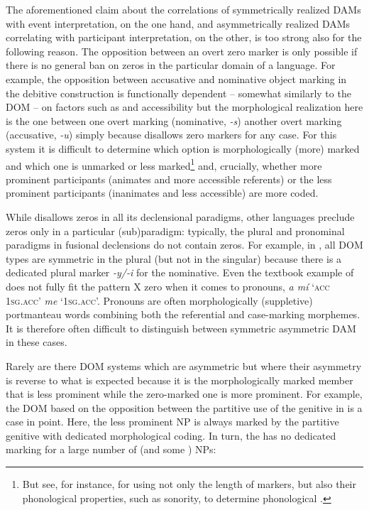 \documentclass[output=paper]{LSP/langsci}
\begin{document}
The aforementioned claim about the correlations of symmetrically realized DAMs with event interpretation, on the one hand, and asymmetrically realized DAMs correlating with participant interpretation, on the other, is too strong also for the following reason. 
The opposition between an overt \vs zero marker is only possible if there is no general ban on zeros in the particular domain of a language. 
For example, the opposition between accusative and nominative object marking in the  debitive construction is functionally dependent – somewhat similarly to the  DOM – on factors such as  and accessibility but the morphological realization here is the one between one overt marking (nominative, \eg \textit{-s}) \vs another overt marking (accusative, \eg \textit{-u}) simply because  disallows zero markers for any case. 
For this  system it is difficult to determine which option is morphologically (more) marked and which one is unmarked or less marked\footnote{But see, for instance, \citet{Keineetal2008Differential} for using not only the length of markers, but also their phonological properties, such as sonority, to determine phonological .} and, crucially, whether more prominent participants (animates and more accessible referents) or the less prominent participants (inanimates and less accessible) are more coded.

While  disallows zeros in all its declensional paradigms, other languages preclude zeros only in a particular (sub)paradigm: typically, the plural and pronominal paradigms in fusional declensions do not contain zeros. 
For example, in , all DOM types are symmetric in the plural (but not in the singular) because there is a dedicated plural marker \textit{-y/-i} for the nominative. 
Even the textbook example of  does not fully fit the pattern X \vs zero when it comes to pronouns, \cf \textit{a mí} `\textsc{acc 1sg.acc}' \vs \textit{me} `\textsc{1sg.acc}'. 
Pronouns are often morphologically (suppletive) portmanteau words combining both the referential and case-marking morphemes. 
It is therefore often difficult to distinguish between symmetric \vs asymmetric DAM in these cases.

Rarely are there DOM systems which are asymmetric but where their asymmetry is reverse to what is expected because it is the morphologically marked member that is less prominent while the zero-marked one is more prominent. 
For example, the DOM based on the opposition between the partitive use of the genitive in  is a case in point. 
Here, the less prominent NP is always marked by the partitive genitive with dedicated morphological coding. 
In turn, the  has no dedicated marking for a large number of  (and some ) NPs: 
\end{document}
